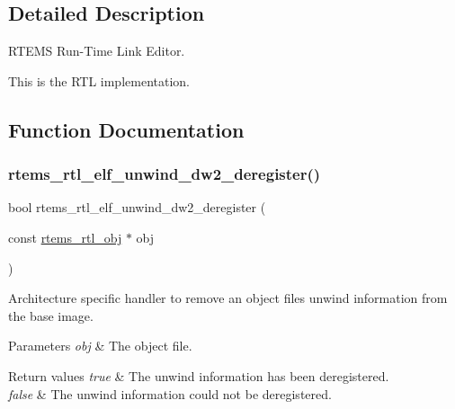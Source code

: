 \subsection{Detailed Description}
R\+T\+E\+MS Run-\/\+Time Link Editor. 

This is the R\+TL implementation. 

\subsection{Function Documentation}
\mbox{\label{rtl-unwind-dw2_8c_a1aceba6bf892b99109243a17fb714f7f}} 
\subsubsection{\texorpdfstring{rtems\_rtl\_elf\_unwind\_dw2\_deregister()}{rtems\_rtl\_elf\_unwind\_dw2\_deregister()}}
{\footnotesize\ttfamily bool rtems\+\_\+rtl\+\_\+elf\+\_\+unwind\+\_\+dw2\+\_\+deregister (\begin{DoxyParamCaption}\item[{const \mbox{\hyperlink{structrtems__rtl__obj}{rtems\+\_\+rtl\+\_\+obj}} $\ast$}]{obj }\end{DoxyParamCaption})}

Architecture specific handler to remove an object file\textquotesingle{}s unwind information from the base image.


\begin{DoxyParams}{Parameters}
{\em obj} & The object file. \\
\hline
\end{DoxyParams}

\begin{DoxyRetVals}{Return values}
{\em true} & The unwind information has been deregistered. \\
\hline
{\em false} & The unwind information could not be deregistered. \\
\hline
\end{DoxyRetVals}
\mbox{\label{rtl-unwind-dw2_8c_a0c7193498e6ee5edea31888a8a904950}} 
